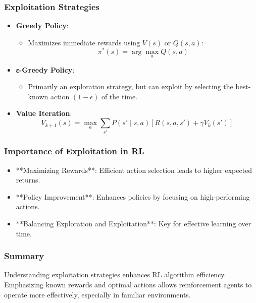 \documentclass[aspectratio=169]{beamer}
\begin{document}
\begin{frame}[fragile]
  \frametitle{Exploitation Strategies}
  \begin{itemize}
    \item \textbf{Greedy Policy}:
    \begin{itemize}
      \item Maximizes immediate rewards using \( V(s) \) or \( Q(s, a) \):
        \begin{equation}
          \pi^*(s) = \arg\max_a Q(s,a)
        \end{equation}
    \end{itemize}
    \item \textbf{ε-Greedy Policy}:
    \begin{itemize}
      \item Primarily an exploration strategy, but can exploit by selecting the best-known action \( (1 - \epsilon) \) of the time.
    \end{itemize}
    \item \textbf{Value Iteration}:
    \begin{equation}
      V_{k+1}(s) = \max_a \sum_{s'} P(s' \mid s, a) [R(s, a, s') + \gamma V_k(s')]
    \end{equation}
  \end{itemize}
\end{frame}

\begin{frame}[fragile]
  \frametitle{Importance of Exploitation in RL}
  \begin{itemize}
    \item **Maximizing Rewards**: Efficient action selection leads to higher expected returns.
    \item **Policy Improvement**: Enhances policies by focusing on high-performing actions.
    \item **Balancing Exploration and Exploitation**: Key for effective learning over time.
  \end{itemize}
\end{frame}

\begin{frame}[fragile]
  \frametitle{Summary}
  Understanding exploitation strategies enhances RL algorithm efficiency. Emphasizing known rewards and optimal actions allows reinforcement agents to operate more effectively, especially in familiar environments.
\end{frame}
\end{document}
